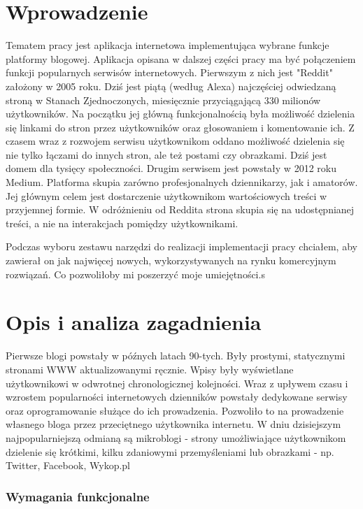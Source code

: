 \documentclass[declaration,shortabstract]{iithesis}
\author         {Oskar Sobczyk}
\date          {}                     %
\begin{document}

\chapter{Wprowadzenie}
Tematem pracy jest aplikacja internetowa implementująca wybrane funkcje platformy blogowej. Aplikacja opisana w dalszej części pracy ma być połączeniem funkcji popularnych serwisów internetowych. Pierwszym z nich jest "Reddit" założony w 2005 roku. Dziś jest piątą (według Alexa) najczęściej odwiedzaną stroną w Stanach Zjednoczonych, miesięcznie przyciągającą 330 milionów użytkowników. Na początku jej główną funkcjonalnością była możliwość dzielenia się linkami do stron przez użytkowników oraz głosowaniem i komentowanie ich. Z czasem wraz z rozwojem serwisu użytkownikom oddano możliwość dzielenia się nie tylko łączami do innych stron, ale też postami czy obrazkami. Dziś jest domem dla tysięcy społeczności. Drugim serwisem jest powstały w 2012 roku Medium. Platforma skupia zarówno profesjonalnych dziennikarzy, jak i amatorów. Jej głównym celem jest dostarczenie użytkownikom wartościowych treści w przyjemnej formie. W odróżnieniu od Reddita strona skupia się na udostępnianej treści, a nie na interakcjach pomiędzy użytkownikami.

Podczas wyboru zestawu narzędzi do realizacji implementacji pracy chciałem, aby zawierał on jak najwięcej nowych, wykorzystywanych na rynku komercyjnym rozwiązań. Co pozwoliłoby mi poszerzyć moje umiejętności.s

\chapter{Opis i analiza zagadnienia}

Pierwsze blogi powstały w późnych latach 90-tych. Były prostymi, statycznymi stronami WWW aktualizowanymi ręcznie. Wpisy były wyświetlane użytkownikowi w odwrotnej chronologicznej kolejności. Wraz z upływem czasu i wzrostem popularności internetowych dzienników powstały dedykowane serwisy oraz oprogramowanie służące do ich prowadzenia. Pozwoliło to na prowadzenie własnego bloga przez przeciętnego użytkownika internetu. W dniu dzisiejszym najpopularniejszą odmianą są mikroblogi - strony umożliwiające użytkownikom dzielenie się krótkimi, kilku zdaniowymi przemyśleniami lub obrazkami - np. Twitter, Facebook, Wykop.pl 

\subsection{Wymagania funkcjonalne}
\end{document}
